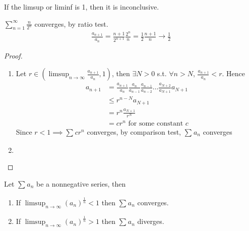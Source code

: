 \begin{remark}
    If the limsup or liminf is 1, then it is inconclusive.
\end{remark}

\begin{example}
    $\sum\limits_{n=1}^{\infty} \frac{n}{2^{n}}$ converges,
    by ratio test.
    \begin{align*}
        \frac{a_{n + 1}}{a_n} = \frac{n+1}{2^{n +1}} \frac{2^{n}}{n}
        = \frac{1}{2} \frac{n+ 1}{n} 
        \to \frac{1}{2}
    \end{align*}
\end{example}

\begin{proof}
    \begin{enumerate}
        \item Let 
        $r \in (\limsup_{n \to \infty} \frac{ a_{n + 1}}{a_n}, 1)$,
        then $\exists N > 0$ s.t. $\forall n > N$, 
        $ \frac{a_{n + 1}}{a_n} < r$.
        Hence 
        \begin{align*}
            a_{n + 1}
            &= 
            \frac{a_{n + 1}}{a_n}
            \frac{a_{n}}{a_{n-1}}
            \frac{a_{n -1 }}{a_{n-2}} 
            \hdots
            \frac{a_{N +2 }}{a_{N+1}} 
            a_{N + 1} \\
            & \leq r^{n - N} a_{N + 1} \\
            & = r^n \frac{a_{N + 1}}{r^N} \\
            &= cr^n \text{ for some constant } c
        \end{align*}
        Since $r < 1 \implies \sum\limits_{}^{} cr^n$
        converges, by comparison test, 
        $\sum\limits_{}^{} a_n$ converges
        \item {}
    \end{enumerate} 
\end{proof}


\begin{theorem}
    \label{thm:nonnegative-series-5}
    Let $\sum\limits_{}^{} a_n$ be a nonnegative series, then 
    \begin{enumerate}
        \item If $\limsup_{n \to \infty} (a_n)^{ \frac{1}{n}} < 1$ then
        $\sum\limits_{}^{} a_n$ converges.
        \item If $\limsup_{n \to \infty} (a_n)^{ \frac{1}{n}} > 1$ then
        $\sum\limits_{}^{} a_n$ diverges.
    \end{enumerate} 
\end{theorem}


